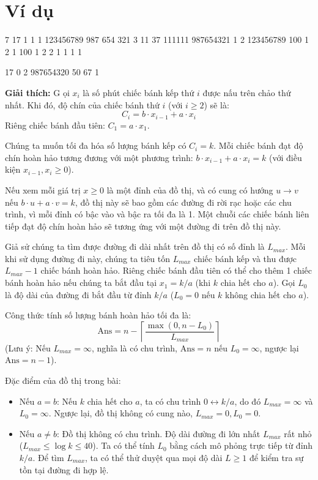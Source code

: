 \documentclass[11pt]{article}
\newcommand{\explanation}[1]{
    \vspace{0.5cm}
    \noindent \textbf{Giải thích:} #1
}
\begin{document}
\section*{Ví dụ}

\begin{inputbox}
7
17 1 1 1
123456789 987 654 321
3 11 37 111111
987654321 1 2 123456789
100 1 2 1
100 1 2 2
1 1 1 1
\end{inputbox}
\begin{outputbox}
17
0
2
987654320
50
67
1
\end{outputbox}


\explanation
Gọi $x_i$ là số phút chiếc bánh kếp thứ $i$ được nấu trên chảo thứ nhất.
Khi đó, độ chín của chiếc bánh thứ $i$ (với $i \ge 2$) sẽ là:
\[ C_i = b \cdot x_{i-1} + a \cdot x_i \]
Riêng chiếc bánh đầu tiên: $C_1 = a \cdot x_1$.

Chúng ta muốn tối đa hóa số lượng bánh kếp có $C_i = k$.
Mỗi chiếc bánh đạt độ chín hoàn hảo tương đương với một phương trình:
$b \cdot x_{i-1} + a \cdot x_i = k$ (với điều kiện $x_{i-1}, x_i \ge 0$).

Nếu xem mỗi giá trị $x \ge 0$ là một đỉnh của đồ thị, và có cung có hướng $u \to v$ nếu $b \cdot u + a \cdot v = k$, đồ thị này sẽ bao gồm các đường đi rời rạc hoặc các chu trình, vì mỗi đỉnh có bậc vào và bậc ra tối đa là 1. Một chuỗi các chiếc bánh liên tiếp đạt độ chín hoàn hảo sẽ tương ứng với một đường đi trên đồ thị này. 

Giả sử chúng ta tìm được đường đi dài nhất trên đồ thị có số đỉnh là $L_{max}$. Mỗi khi sử dụng đường đi này, chúng ta tiêu tốn $L_{max}$ chiếc bánh kếp và thu được $L_{max} - 1$ chiếc bánh hoàn hảo. Riêng chiếc bánh đầu tiên có thể cho thêm 1 chiếc bánh hoàn hảo nếu chúng ta bắt đầu tại $x_1 = k/a$ (khi $k$ chia hết cho $a$). Gọi $L_0$ là độ dài của đường đi bắt đầu từ đỉnh $k/a$ ($L_0 = 0$ nếu $k$ không chia hết cho $a$).

Công thức tính số lượng bánh hoàn hảo tối đa là:
\[ \text{Ans} = n - \left\lceil \frac{\max(0, n - L_0)}{L_{max}} \right\rceil \]
(Lưu ý: Nếu $L_{max} = \infty$, nghĩa là có chu trình, $\text{Ans} = n$ nếu $L_0 = \infty$, ngược lại $\text{Ans} = n - 1$).

Đặc điểm của đồ thị trong bài:
\begin{itemize}
    \item Nếu $a = b$: Nếu $k$ chia hết cho $a$, ta có chu trình $0 \leftrightarrow k/a$, do đó $L_{max} = \infty$ và $L_0 = \infty$. Ngược lại, đồ thị không có cung nào, $L_{max} = 0, L_0 = 0$.
    \item Nếu $a \neq b$: Đồ thị không có chu trình. Độ dài đường đi lớn nhất $L_{max}$ rất nhỏ ($L_{max} \le \log k \le 40$). Ta có thể tính $L_0$ bằng cách mô phỏng trực tiếp từ đỉnh $k/a$. Để tìm $L_{max}$, ta có thể thử duyệt qua mọi độ dài $L \ge 1$ để kiểm tra sự tồn tại đường đi hợp lệ.
\end{itemize}
\end{document}
